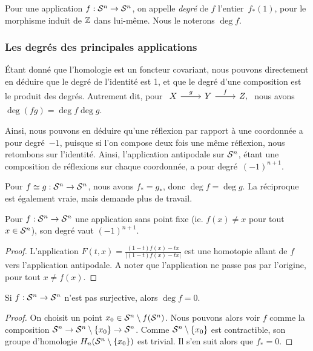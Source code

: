 \begin{definition}
Pour une application $f:\mathcal{S}^{n}\to\mathcal{S}^{n}$, on appelle \emph{degré} de $f$ l'entier~$f_\ast(1)$, pour le morphisme induit de $\mathbb{Z}$ dans lui-même. Nous le noterons $\deg f$.
\end{definition}

\subsubsection{Les degrés des principales applications}

Étant donné que l'homologie est un foncteur covariant, nous pouvons directement en déduire que le degré de l'identité est 1, et que le degré d'une composition est le produit des degrés. Autrement dit, pour $\begin{tikzcd}
X\arrow[r,"g"]&Y\arrow[r,"f"]&Z,
\end{tikzcd}$ nous avons $\deg(fg)=\deg f\deg g$.

Ainsi, nous pouvons en déduire qu'une réflexion par rapport à une coordonnée a pour degré~$-1$, puisque si l'on compose deux fois une même réflexion, nous retombons sur l'identité. Ainsi, l'application antipodale sur $\mathcal{S}^{n}$, étant une composition de réflexions sur chaque coordonnée, a pour degré~$(-1)^{n+1}$.

Pour $f\simeq g:\mathcal{S}^{n}\to\mathcal{S}^{n}$, nous avons $f_\ast=g_\ast$, donc $\deg f=\deg g$. La réciproque est également vraie, mais demande plus de travail.

\begin{proposition}\label{prop:deg-fixed-point}
Pour $f:\mathcal{S}^{n}\to\mathcal{S}^{n}$ une application sans point fixe (ie. $f(x)\neq x$ pour tout~${x\in\mathcal{S}^{n}}$), son degré vaut $(-1)^{n+1}$.
\end{proposition}
\begin{proof}
L'application $F(t,x)=\frac{(1-t)f(x)-tx}{|(1-t)f(x)-tx|}$ est une homotopie allant de $f$ vers l'application antipodale. A noter que l'application ne passe pas par l'origine, pour tout $x\neq f(x)$.
\end{proof}

\begin{proposition}
Si $f:\mathcal{S}^{n}\to\mathcal{S}^{n}$ n'est pas surjective, alors $\deg f=0$.
\end{proposition}
\begin{proof}
On choisit un point $x_0\in \mathcal{S}^{n}\setminus f(\mathcal{S}^{n})$. Nous pouvons alors voir $f$ comme la composition $\mathcal{S}^{n}\to\mathcal{S}^{n}\setminus\{x_0\}\to\mathcal{S}^{n}$. Comme $\mathcal{S}^{n}\setminus\{x_0\}$ est contractible, son groupe d'homologie $H_n(\mathcal{S}^{n}\setminus\{x_0\})$ est trivial. Il s'en suit alors que $f_\ast=0$.
\end{proof}

